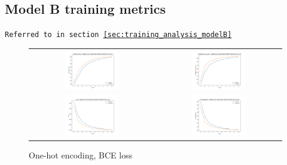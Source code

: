 \begin{appendices}
        \subsection{Model B training metrics}
        \label{app:modelB_training}
        \texttt{Referred to in section \ref{sec:training_analysis_modelB}}
        
        \begin{figure}[H]
            \centering
            \begin{tabular}{cc}
                \includegraphics[width=0.45\textwidth]{figures/training_plots/ModelB-(1D)-OneHot-BCE-ADAM_07-04-2019_02-15-18_AON-accuracy.pdf} & \includegraphics[width=0.45\textwidth]{figures/training_plots/ModelB-(1D)-OneHot-BCE-ADAM_07-04-2019_02-15-18_categorical-accuracy.pdf} \\
                \includegraphics[width=0.45\textwidth]{figures/training_plots/ModelB-(1D)-OneHot-BCE-ADAM_07-04-2019_02-15-18_loss.pdf} & \includegraphics[width=0.45\textwidth]{figures/training_plots/ModelB-(1D)-OneHot-BCE-ADAM_07-04-2019_02-15-18_KL-divergence.pdf}
            \end{tabular}
            \caption*{One-hot encoding, BCE loss}
        \end{figure}
        

\end{appendices}
